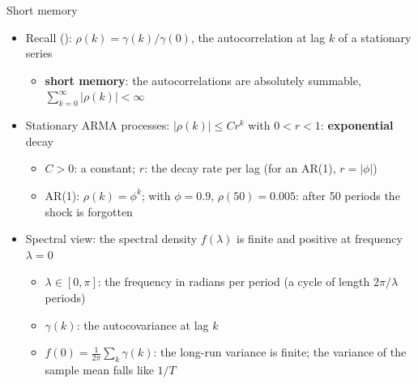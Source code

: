 \begin{frame}{Short memory}
\itemsize{\small}
\begin{itemize}
    \item Recall (): $\rho(k) = \gamma(k)/\gamma(0)$, the autocorrelation at lag $k$ of a stationary series
    \begin{itemize}
        \item \textbf{short memory}: the autocorrelations are absolutely summable, $\sum_{k=0}^{\infty}|\rho(k)| < \infty$
    \end{itemize}
    \item Stationary ARMA processes: $|\rho(k)| \le C r^k$ with $0 < r < 1$: \textbf{exponential} decay
    \begin{itemize}
        \item $C > 0$: a constant; $r$: the decay rate per lag (for an AR(1), $r = |\phi|$)
        \item AR(1): $\rho(k) = \phi^k$; with $\phi = 0.9$, $\rho(50) = 0.005$: after 50 periods the shock is forgotten
    \end{itemize}
    \item Spectral view: the spectral density $f(\lambda)$ is finite and positive at frequency $\lambda = 0$
    \begin{itemize}
        \item $\lambda \in [0, \pi]$: the frequency in radians per period (a cycle of length $2\pi/\lambda$ periods)
        \item $\gamma(k)$: the autocovariance at lag $k$
        \item $f(0) = \frac{1}{2\pi}\sum_k \gamma(k)$: the long-run variance is finite; the variance of the sample mean falls like $1/T$
    \end{itemize}
\end{itemize}
\end{frame}

